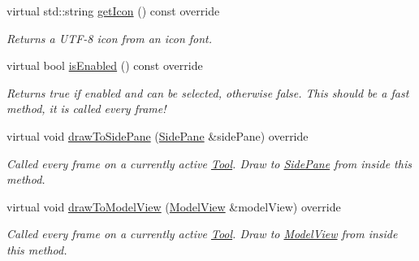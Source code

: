 \begin{DoxyCompactItemize}
virtual std\+::string \mbox{\hyperlink{classpepr3d_1_1_segmentation_af67898a59f818d71a97069b2fe62bd25}{get\+Icon}} () const override
\begin{DoxyCompactList}\small\item\em Returns a U\+T\+F-\/8 icon from an icon font. \end{DoxyCompactList}\item 
\mbox{\label{classpepr3d_1_1_segmentation_acd5aff018741e43604441d50701492fa}} 
virtual bool \mbox{\hyperlink{classpepr3d_1_1_segmentation_acd5aff018741e43604441d50701492fa}{is\+Enabled}} () const override
\begin{DoxyCompactList}\small\item\em Returns true if enabled and can be selected, otherwise false. This should be a fast method, it is called every frame! \end{DoxyCompactList}\item 
\mbox{\label{classpepr3d_1_1_segmentation_ac823ffa67827629012a45f3ac9a22c72}} 
virtual void \mbox{\hyperlink{classpepr3d_1_1_segmentation_ac823ffa67827629012a45f3ac9a22c72}{draw\+To\+Side\+Pane}} (\mbox{\hyperlink{classpepr3d_1_1_side_pane}{Side\+Pane}} \&side\+Pane) override
\begin{DoxyCompactList}\small\item\em Called every frame on a currently active \mbox{\hyperlink{classpepr3d_1_1_tool}{Tool}}. Draw to \mbox{\hyperlink{classpepr3d_1_1_side_pane}{Side\+Pane}} from inside this method. \end{DoxyCompactList}\item 
\mbox{\label{classpepr3d_1_1_segmentation_aba217ddc3fefb9f9a253bcaee39df3b2}} 
virtual void \mbox{\hyperlink{classpepr3d_1_1_segmentation_aba217ddc3fefb9f9a253bcaee39df3b2}{draw\+To\+Model\+View}} (\mbox{\hyperlink{classpepr3d_1_1_model_view}{Model\+View}} \&model\+View) override
\begin{DoxyCompactList}\small\item\em Called every frame on a currently active \mbox{\hyperlink{classpepr3d_1_1_tool}{Tool}}. Draw to \mbox{\hyperlink{classpepr3d_1_1_model_view}{Model\+View}} from inside this method. \end{DoxyCompactList}\item 
\mbox{\label{classpepr3d_1_1_segmentation_a7c9ae1b970f2b19f7c8cc6d7009b106d}} 

\end{DoxyCompactItemize}
